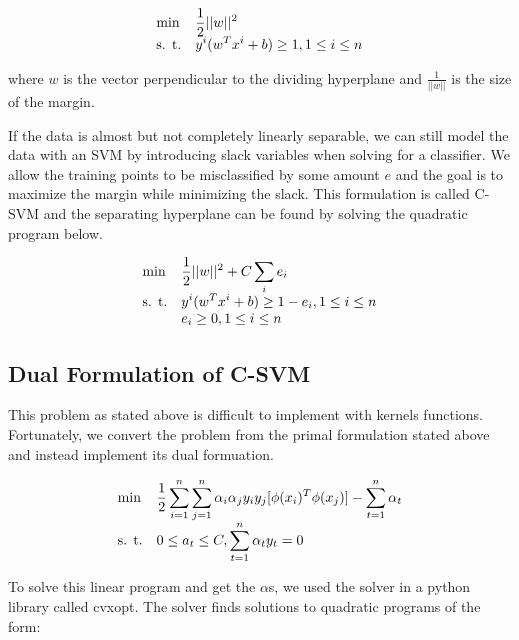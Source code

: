 \documentclass[10pt,twoside]{article}
\begin{document}
\begin{equation}
\begin{array}{ll@{}ll}
\text{min}  & \displaystyle \frac{1}{2} ||w||^2 &\\
\text{s. t.}& \displaystyle y^i(w^T x^i + b) \geq 1 , 1 \leq i \leq n
\end{array}
\end{equation}

where $w$ is the vector perpendicular to the dividing hyperplane and $\frac{1}{||w||}$ is the size of the margin.

If the data is almost but not completely linearly separable, we can still model the data with an SVM by introducing slack variables when solving for a classifier. We allow the training points to be misclassified by some amount $e$ and the goal is to maximize the margin while minimizing the slack. This formulation is called C-SVM and the separating hyperplane can be found by solving the quadratic program below.

\begin{equation}
\begin{array}{ll@{}ll}
\text{min}  & \displaystyle \frac{1}{2} ||w||^2 + C \sum_i e_i &\\
\text{s. t.}& \displaystyle y^i(w^T x^i + b) \geq 1 - e_i , 1 \leq i \leq n \\
& e_i \geq 0 , 1 \leq i \leq n
\end{array}
\end{equation}

\subsection{Dual Formulation of C-SVM}
This problem as stated above is difficult to implement with kernels functions. Fortunately, we convert the problem from the primal formulation stated above and instead implement its dual formuation.

\begin{equation}
\begin{array}{ll@{}ll}
\text{min}  & \displaystyle \frac{1}{2} \sum_{i=1}^{n} \sum_{j=1}^n \alpha_i \alpha_j y_i y_j [\phi(x_i)^T \phi(x_j)] - \sum_{t=1}^{n} \alpha_t &\\
\text{s. t.}& \displaystyle 0 \leq a_t \leq C , \sum_{t=1}^{n} \alpha_t y_t = 0
\end{array}
\end{equation}

To solve this linear program and get the $\alpha$s, we used the solver in a python library called cvxopt. The solver finds solutions to quadratic programs of the form:
\end{document}
